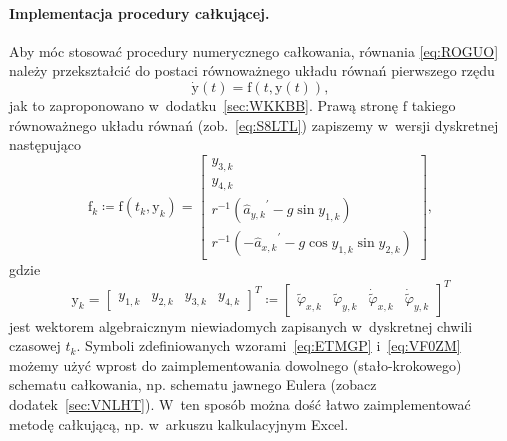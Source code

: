 \documentclass[paper=a4,DIV=12]{tmmlab}
\newcommand{\brm}[1]{\bm{\mathrm{#1}}}
\begin{document}
\paragraph{Implementacja procedury całkującej.}
Aby móc stosować procedury numerycznego całkowania, równania \eqref{eq:ROGUO}
należy przekształcić do postaci równoważnego układu równań pierwszego rzędu
\begin{equation}
  \dot{\brm{y}}\left(t\right) = \brm{f}\left(t,\brm{y}\left(t\right)\right),
  \label{eq:DOHJE}
\end{equation}
jak to zaproponowano w~dodatku~\ref{sec:WKKBB}. Prawą stronę $\brm{f}$
takiego równoważnego układu równań (zob.~\eqref{eq:S8LTL}) zapiszemy w~wersji
dyskretnej następująco
\begin{equation}
  \brm{f}_k \coloneqq \brm{f}\left(t_k, \brm{y}_k\right) = \begin{bmatrix}
    y_{3,k} \\
    y_{4,k} \\
    r^{-1} \left( {\hat{a}_{y,k}}^{\prime} - g \sin{y_{1,k}} \right)  \\
    r^{-1} \left(-{\hat{a}_{x,k}}^{\prime} - g \cos{y_{1,k}}\sin{y_{2,k}} \right)
  \end{bmatrix},
  \label{eq:ETMGP}
\end{equation}
gdzie
\begin{equation}
  \brm{y}_k = \begin{bmatrix}
    y_{1,k} & y_{2,k} & y_{3,k} & y_{4,k}
  \end{bmatrix}^T \coloneqq \begin{bmatrix}
    \widetilde{\varphi}_{x,k} &
    \widetilde{\varphi}_{y,k} &
    \dot{\widetilde{\varphi}}_{x,k} &
    \dot{\widetilde{\varphi}}_{y,k}
  \end{bmatrix}^T
  \label{eq:VF0ZM}
\end{equation}
jest wektorem algebraicznym niewiadomych zapisanych w~dyskretnej chwili
czasowej $t_k$. Symboli zdefiniowanych wzorami~\eqref{eq:ETMGP}
i~\eqref{eq:VF0ZM} możemy użyć wprost do zaimplementowania dowolnego
(stało-krokowego) schematu całkowania, np. schematu jawnego Eulera (zobacz
dodatek~\ref{sec:VNLHT}). W~ten sposób można dość łatwo zaimplementować metodę
całkującą, np. w~arkuszu kalkulacyjnym Excel.
\end{document}
